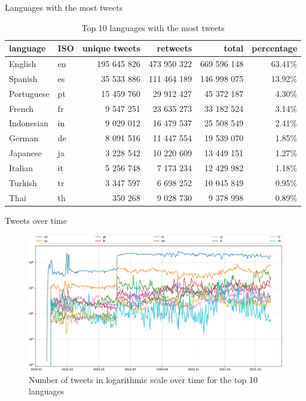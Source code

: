 \documentclass[8pt]{beamer}  %
\begin{document}
\begin{frame}{Languages with the most tweets}
    
    \begin{table}[H]
        \centering
        \begin{tabularx}{\columnwidth}{@{}llrrrr@{}}
        		\bottomrule
        		\textbf{language} & \textbf{ISO} & \textbf{unique tweets} & \textbf{retweets} & \textbf{total} & \textbf{percentage} \\
        		\midrule
            English & en & 195 645 826 & 473 950 322 & 669 596 148 & 63.41\% 
            \\
    		Spanish & es & 35 533 886 & 111 464 189 & 146 998 075 & 13.92\% 
    		\\
    		Portuguese & pt & 15 459 760 & 29 912 427 & 45 372 187 & 4.30\% 
    		\\
    		French & fr & 9 547 251 & 23 635 273 & 33 182 524 & 3.14\% 
    		\\
    		Indonesian & in & 9 029 012 & 16 479 537 & 25 508 549 & 2.41\%
    		\\
    		German & de & 8 091 516 & 11 447 554 & 19 539 070 & 1.85\%
    		\\
    		Japanese & ja & 3 228 542 & 10 220 609 & 13 449 151 & 1.27\%
    		\\
    		Italian & it & 5 256 748 & 7 173 234 & 12 429 982 & 1.18\%
    		\\
    		Turkish & tr & 3 347 597 & 6 698 252 & 10 045 849 & 0.95\%
    		\\
    		Thai & th & 350 268 & 9 028 730 & 9 378 998 & 0.89\%
    		\\
    		\bottomrule
        \end{tabularx}
        \caption{Top 10 languages with the most tweets}
        \label{tab:dataset-language-stats}
    \end{table}

\end{frame}

\begin{frame}{Tweets over time}

    \begin{figure}[H]
    	\centering
    	\includegraphics[scale=.25]{assets/img/tweets_per_language_over_time}
    	\caption{Number of tweets in logarithmic scale over time for the top 10 languages}
    	\label{fig:tweets-language-over-time}
    \end{figure}

\end{frame}
\end{document}
